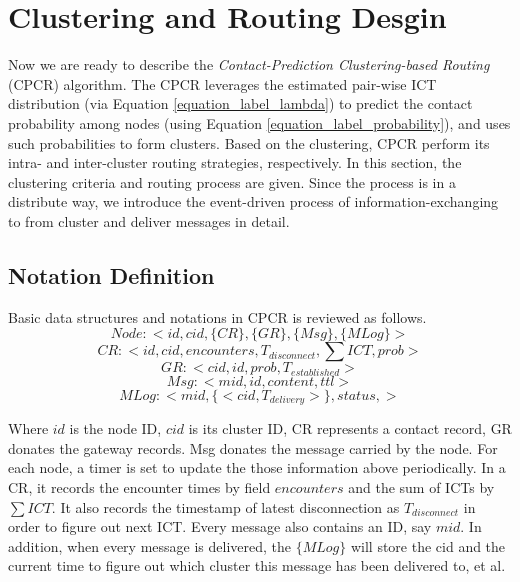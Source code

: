 \section{Clustering and Routing Desgin}
\label{Section4_algorithm}

Now we are ready to describe the \emph{Contact-Prediction Clustering-based Routing} (CPCR) algorithm.
The CPCR leverages the estimated pair-wise ICT distribution (via Equation \ref{equation_label_lambda}) to predict the contact probability among nodes (using Equation \ref{equation_label_probability}), and uses such probabilities to form clusters. Based on the clustering, CPCR perform its intra- and inter-cluster routing strategies, respectively. In this section, the clustering criteria and routing process are given. Since the process is in a distribute way, we introduce the event-driven process of information-exchanging to from cluster and deliver messages in detail.
\subsection{Notation Definition}
Basic data structures and notations in CPCR is reviewed as follows.
\begin{equation}
 Node :<id, cid, \{CR\}, \{GR\}, \{Msg\},\{MLog\}>
\end{equation}
\begin{equation}\label{xxx}
  CR:<id,cid,encounters,T_{disconnect},\sum ICT,prob>
\end{equation}
\begin{equation}\label{xxx2}
GR :<cid,id,prob,T_{established}>
\end{equation}
\begin{equation}\label{xxx3}
Msg:<mid,id,content,ttl>
\end{equation}
\begin{equation}\label{xxx4}
MLog:<mid,\{<cid,T_{delivery}>\},status,>
\end{equation}

Where $id$ is the node ID, $cid$ is its cluster ID, CR represents a contact record, GR donates the gateway records. Msg donates the message carried by the node. For each node, a timer is set to update the those information above periodically. In a CR, it records the encounter times by field $encounters$ and the sum of ICTs by $\sum ICT$. It also records the timestamp of latest disconnection as $T_{disconnect}$ in order to figure out next ICT. Every message also contains an ID, say $mid$. In addition, when every message is delivered, the $\{MLog\}$ will store the cid and the current time to figure out which cluster this message has been delivered to, et al.

